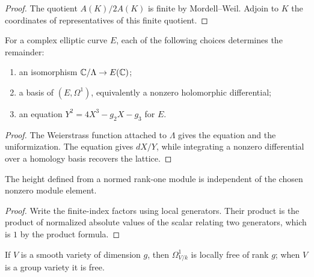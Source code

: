 \begin{proof}

The quotient $A(K)/2A(K)$ is finite by Mordell--Weil.  Adjoin to $K$ the
coordinates of representatives of this finite quotient.

\end{proof}


\begin{proposition}
\label{prop:milne-faltings-height-normalization}

For a complex elliptic curve $E$, each of the following choices determines the
remainder:
\begin{enumerate}
\item an isomorphism $\mathbb{C}/\Lambda\to E(\mathbb{C})$;
\item a basis of $(E,\Omega^1)$, equivalently a nonzero holomorphic
differential;
\item an equation $Y^2=4X^3-g_2X-g_3$ for $E$.
\end{enumerate}
\end{proposition}

\begin{proof}

The Weierstrass function attached to $\Lambda$ gives the equation and the
uniformization.  The equation gives $dX/Y$, while integrating a nonzero
differential over a homology basis recovers the lattice.

\end{proof}


\begin{lemma}
\label{lem:milne-faltings-height-formula}

The height defined from a normed rank-one module is independent of the chosen
nonzero module element.
\end{lemma}

\begin{proof}

Write the finite-index factors using local generators.  Their product is the
product of normalized absolute values of the scalar relating two generators,
which is $1$ by the product formula.

\end{proof}


\begin{proposition}
\label{prop:milne-arakelov-determinant}

If $V$ is a smooth variety of dimension $g$, then $\Omega^1_{V/k}$ is locally
free of rank $g$; when $V$ is a group variety it is free.
\end{proposition}

